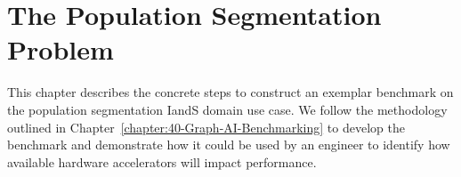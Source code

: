 \renewcommand{\thechapter}{5}
\chapter{The Population Segmentation Problem}
\label{chapter:50-Community-Detection-Case-Study}

This chapter describes the concrete steps to construct an exemplar benchmark on the population segmentation \ac{IandS} domain use case. We follow the methodology outlined in Chapter~\ref{chapter:40-Graph-AI-Benchmarking} to develop the benchmark and demonstrate how it could be used by an engineer to identify how available hardware accelerators will impact \gai performance.

















